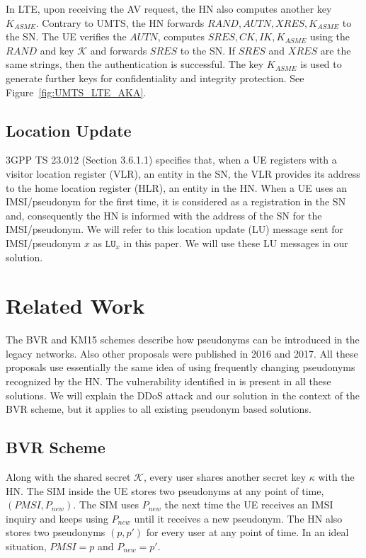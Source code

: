 \documentclass{llncs} %
\begin{document}
In LTE, upon receiving the AV request, the HN also computes another key $K_{ASME}$. Contrary to UMTS, the HN forwards $RAND,AUTN,XRES,K_{ASME}$ to the SN. The UE verifies the $AUTN$, computes $SRES,CK,IK, K_{ASME}$ using the $RAND$ and key $\mathcal{K}$ and forwards $SRES$ to the SN. If $SRES$ and $XRES$ are the same strings, then the authentication is successful. The key $K_{ASME}$ is used to generate further keys for confidentiality and integrity protection. See Figure~\ref{fig:UMTS_LTE_AKA}.



\subsection{Location Update} 3GPP TS 23.012 (Section 3.6.1.1) \cite{TS23012} specifies that, when a UE registers with a visitor location register (VLR), an entity in the SN, the  VLR provides its address to the home location register (HLR), an entity in the HN. When a UE uses an IMSI/pseudonym for the first time, it is considered as a registration in the SN and, consequently the HN is informed with the address of the SN for the IMSI/pseudonym. We will refer to this location update (LU) message sent for IMSI/pseudonym $x$ as $\texttt{LU}_{x}$ in this paper. We will use these LU messages in our solution.


\section{Related Work}
The BVR and KM15 schemes describe how pseudonyms can be introduced in the legacy networks. Also other proposals \cite{Ginzboorg_Niemi_2016,Norrman_Naslund_Dubrova_2016,yemen2017} were published in 2016 and 2017. All these proposals use essentially the same idea of using frequently changing pseudonyms recognized by the HN. The vulnerability identified in \cite{wisec17} is present in all these solutions. We will explain the DDoS attack and our solution in the context of the BVR scheme, but it applies to all existing pseudonym based solutions.

\subsection{BVR Scheme}
Along with the shared secret $\mathcal{K}$, every user shares another secret key $\kappa$ with the HN. The SIM inside the UE stores two pseudonyms at any point of time, $\left(PMSI,P_{new}\right)$. The SIM uses $P_{new}$ the next time the UE receives an IMSI inquiry and keeps using $P_{new}$ until it receives a new pseudonym. The HN also stores two pseudonyms $\left(p,p'\right)$ for every user at any point of time. In an ideal situation, $PMSI = p$ and $P_{new} = p'$. 
\end{document}
